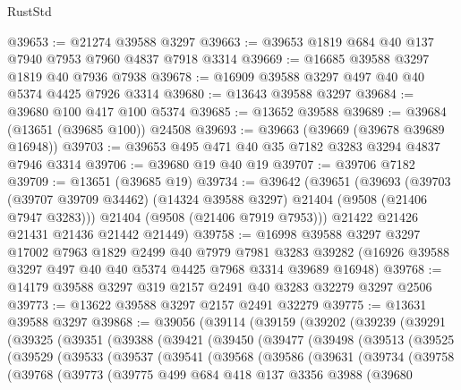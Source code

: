 \begin{lexlean}{RustStd}
\begin{coremodule}
@39653 := @21274 @39588 @3297
@39663 := @39653 @1819 @684 @40 @137 @7940 @7953 @7960 @4837 @7918 @3314
@39669 := @16685 @39588 @3297 @1819 @40 @7936 @7938
@39678 := @16909 @39588 @3297 @497 @40 @40 @5374 @4425 @7926 @3314
@39680 := @13643 @39588 @3297
@39684 := @39680 @100 @417 @100 @5374
@39685 := @13652 @39588
@39689 := @39684 (@13651 (@39685 @100)) @24508
@39693 := @39663 (@39669 (@39678 @39689 @16948))
@39703 := @39653 @495 @471 @40 @35 @7182 @3283 @3294 @4837 @7946 @3314
@39706 := @39680 @19 @40 @19
@39707 := @39706 @7182
@39709 := @13651 (@39685 @19)
@39734 := @39642
    (@39651
      (@39693
        (@39703 (@39707 @39709 @34462) (@14324 @39588 @3297) @21404 (@9508 (@21406 @7947 @3283)))
        @21404
        (@9508 (@21406 @7919 @7953)))
      @21422
      @21426
      @21431
      @21436
      @21442
      @21449)
@39758 := @16998
    @39588
    @3297
    @3297
    @17002
    @7963
    @1829
    @2499
    @40
    @7979
    @7981
    @3283
    @39282
    (@16926 @39588 @3297 @497 @40 @40 @5374 @4425 @7968 @3314 @39689 @16948)
@39768 := @14179 @39588 @3297 @319 @2157 @2491 @40 @3283 @32279 @3297 @2506
@39773 := @13622 @39588 @3297 @2157 @2491 @32279
@39775 := @13631 @39588 @3297
@39868 := @39056
    (@39114
      (@39159
        (@39202
          (@39239
            (@39291
              (@39325
                (@39351
                  (@39388
                    (@39421
                      (@39450
                        (@39477
                          (@39498
                            (@39513
                              (@39525
                                (@39529
                                  (@39533
                                    (@39537
                                      (@39541
                                        (@39568
                                          (@39586
                                            (@39631
                                              (@39734
                                                (@39758
                                                  (@39768
                                                    (@39773
                                                      (@39775
                                                        @499
                                                        @684
                                                        @418
                                                        @137
                                                        @3356
                                                        @3988
                                                        (@39680

\end{coremodule}
\end{lexlean}

